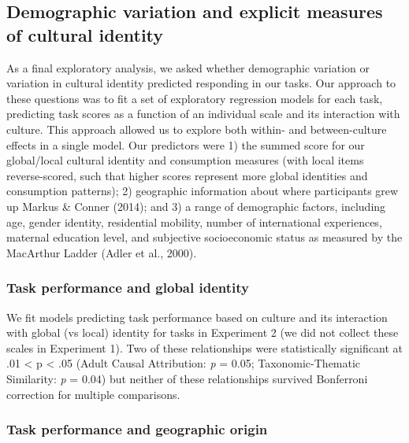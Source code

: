 \documentclass[
  man,floatsintext]{apa6}
\begin{document}
\hypertarget{demographic-variation-and-explicit-measures-of-cultural-identity}{%
\subsection{Demographic variation and explicit measures of cultural identity}\label{demographic-variation-and-explicit-measures-of-cultural-identity}}

As a final exploratory analysis, we asked whether demographic variation or variation in cultural identity predicted responding in our tasks. Our approach to these questions was to fit a set of exploratory regression models for each task, predicting task scores as a function of an individual scale and its interaction with culture. This approach allowed us to explore both within- and between-culture effects in a single model. Our predictors were 1) the summed score for our global/local cultural identity and consumption measures (with local items reverse-scored, such that higher scores represent more global identities and consumption patterns); 2) geographic information about where participants grew up Markus \& Conner (2014); and 3) a range of demographic factors, including age, gender identity, residential mobility, number of international experiences, maternal education level, and subjective socioeconomic status as measured by the MacArthur Ladder (Adler et al., 2000).

\hypertarget{task-performance-and-global-identity}{%
\subsubsection{Task performance and global identity}\label{task-performance-and-global-identity}}

We fit models predicting task performance based on culture and its interaction with global (vs local) identity for tasks in Experiment 2 (we did not collect these scales in Experiment 1). Two of these relationships were statistically significant at .01 \textless{} p \textless{} .05 (Adult Causal Attribution: \emph{p} = 0.05; Taxonomic-Thematic Similarity: \emph{p} = 0.04) but neither of these relationships survived Bonferroni correction for multiple comparisons.

\hypertarget{task-performance-and-geographic-origin}{%
\subsubsection{Task performance and geographic origin}\label{task-performance-and-geographic-origin}}
\end{document}
